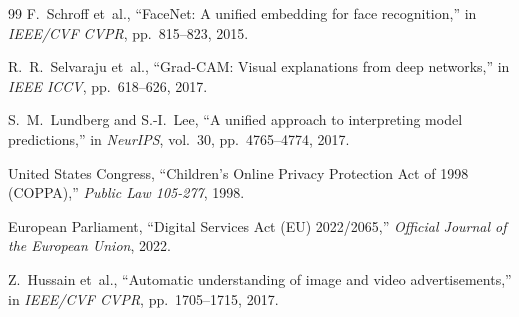\documentclass[12pt,a4paper]{report}
\begin{document}
\begin{thebibliography}{99}
F.~Schroff et~al.,
\newblock ``FaceNet: A unified embedding for face recognition,''
\newblock in \emph{IEEE/CVF CVPR}, pp.~815--823, 2015.

R.~R.~Selvaraju et~al.,
\newblock ``Grad-CAM: Visual explanations from deep networks,''
\newblock in \emph{IEEE ICCV}, pp.~618--626, 2017.

S.~M.~Lundberg and S.-I.~Lee,
\newblock ``A unified approach to interpreting model predictions,''
\newblock in \emph{NeurIPS}, vol.~30, pp.~4765--4774, 2017.

United States Congress,
\newblock ``Children's Online Privacy Protection Act of 1998 (COPPA),''
\newblock \emph{Public Law 105-277}, 1998.

European Parliament,
\newblock ``Digital Services Act (EU) 2022/2065,''
\newblock \emph{Official Journal of the European Union}, 2022.

Z.~Hussain et~al.,
\newblock ``Automatic understanding of image and video advertisements,''
\newblock in \emph{IEEE/CVF CVPR}, pp.~1705--1715, 2017.

\end{thebibliography}
\end{document}
